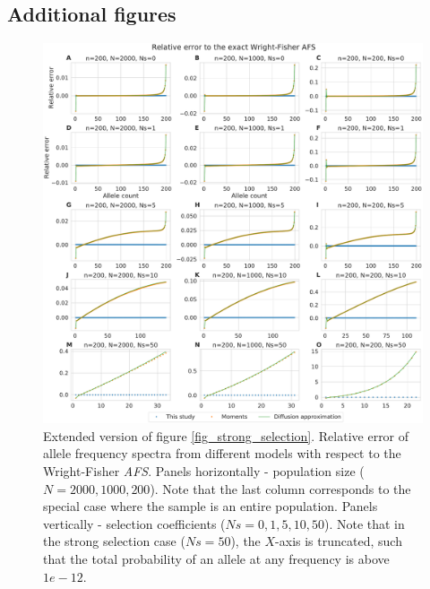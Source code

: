 \documentclass[review,nonatbib]{elsarticle}
\begin{document}
\subsection{Additional figures}
\label{subsec_apx_figures}

\begin{figure}[H]
  \centering
  \includegraphics[width=\textwidth]{fig/afs_comp_big.pdf}

    \caption{Extended version of figure \ref{fig_strong_selection}. Relative error of allele
    frequency spectra from different models with respect to the Wright-Fisher \textit{AFS}. Panels
    horizontally - population size ($N=2000,1000,200$). Note that the last column corresponds to the
    special case where the sample is an entire population. Panels vertically - selection
    coefficients ($Ns=0,1,5,10,50$). Note that in the strong selection case ($Ns=50$), the $X$-axis
    is truncated, such that the total probability of an allele at any frequency is above $1e-12$.
    }

  \label{fig_apx_strong_selection_extended}
\end{figure}
\end{document}
